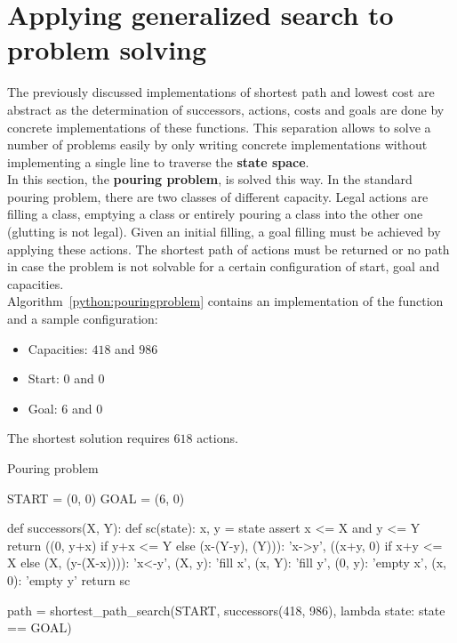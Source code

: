 \documentclass{report}
\begin{document}
\section{Applying generalized search to problem solving}
The previously discussed implementations of shortest path and lowest cost are abstract as the determination of successors, actions, costs and goals are done by concrete implementations of these functions.
This separation allows to solve a number of problems easily by only writing concrete implementations without implementing a single line to traverse the {\bf state space}.
\\
In this section, the {\bf pouring problem}, is solved this way. In the standard pouring problem, there are two classes of different capacity.
Legal actions are filling a class, emptying a class or entirely pouring a class into the other one (glutting is not legal).
Given an initial filling, a goal filling must be achieved by applying these actions.
The shortest path of actions must be returned or no path in case the problem is not solvable for a certain configuration of start, goal and capacities.
\\
Algorithm~\ref{python:pouringproblem} contains an implementation of the function and a sample configuration:
\begin{itemize}
\item Capacities: $418$ and $986$
\item Start: $0$ and $0$
\item Goal: $6$ and $0$
\end{itemize}

The shortest solution requires $618$ actions.


\begin{algorithm}
\caption{Pouring problem}
\label{python:pouringproblem}
\begin{python}
START = (0, 0)
GOAL = (6, 0)

def successors(X, Y):
    def sc(state):
        x, y = state
        assert x <= X and y <= Y
        return {((0, y+x) if y+x <= Y else (x-(Y-y), (Y))): 'x->y',
                ((x+y, 0) if x+y <= X else (X, (y-(X-x)))): 'x<-y',
                (X, y): 'fill x',
                (x, Y): 'fill y',
                (0, y): 'empty x',
                (x, 0): 'empty y'}
    return sc

path = shortest_path_search(START,
       successors(418, 986),
       lambda state: state == GOAL)
\end{python}
\end{algorithm}
\end{document}
